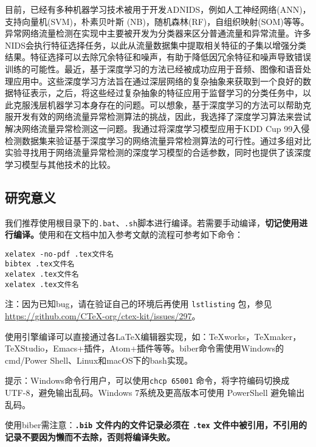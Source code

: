 目前，已经有多种机器学习技术被用于开发ADNIDS，例如人工神经网络(ANN)，支持向量机(SVM)，朴素贝叶斯 (NB)，随机森林(RF)，自组织映射(SOM)等等。异常网络流量检测在实现中主要被开发为分类器来区分普通流量和异常流量。许多NIDS会执行特征选择任务，以此从流量数据集中提取相关特征的子集以增强分类结果。特征选择可以去除冗余特征和噪声，有助于降低因冗余特征和噪声导致错误训练的可能性。最近，基于深度学习的方法已经被成功应用于音频、图像和语音处理应用中。这些深度学习方法旨在通过深层网络的复杂抽象来获取到一个良好的数据特征表示，之后，将这些经过复杂抽象的特征应用于监督学习的分类任务中，以此克服浅层机器学习本身存在的问题。可以想象，基于深度学习的方法可以帮助克服开发有效的网络流量异常检测算法的挑战，因此，我选择了深度学习算法来尝试解决网络流量异常检测这一问题。我通过将深度学习模型应用于KDD Cup 99入侵检测数据集来验证基于深度学习的网络流量异常检测算法的可行性。通过多组对比实验寻找用于网络流量异常检测的深度学习模型的合适参数，同时也提供了该深度学习模型与其他技术的比较。

\subsection{研究意义}

我们推荐使用根目录下的\verb|.bat|、\verb|.sh|脚本进行编译。若需要手动编译，\textbf{切记使用\XeLaTeX 进行编译。}使用\XeLaTeX 和在文档中加入参考文献的流程可参考如下命令：

\iffalse
\begin{lstlisting}[basicstyle=\small\ttfamily, caption=手动逐次编译, numbers=none]
xelatex -no-pdf .tex文件名
bibtex .tex文件名
xelatex .tex文件名
xelatex .tex文件名
\end{lstlisting}
\else
\begin{verbatim}
xelatex -no-pdf .tex文件名
bibtex .tex文件名
xelatex .tex文件名
xelatex .tex文件名
\end{verbatim}

注：因为已知bug，请在验证自己的环境后再使用 \texttt{lstlisting} 包，参见\url{https://github.com/CTeX-org/ctex-kit/issues/297}。

\fi

使用\XeLaTeX 引擎编译可以直接通过各\LaTeX 编辑器实现，如：TeXworks，TeXmaker，TeXStudio，Emacs+插件，Atom+插件等等。biber命令需使用Windows的cmd/Power Shell、Linux和macOS下的bash实现。

提示：Windows命令行用户，可以使用\verb|chcp 65001| 命令，将字符编码切换成 UTF-8，避免输出乱码。Windows 7系统及更高版本可使用 PowerShell 避免输出乱码。

使用biber需注意：\textbf{\texttt{.bib} 文件内的文件记录必须在 \texttt{.tex} 文件中被引用，不引用的记录不要因为懒而不去除，否则将编译失败。}

